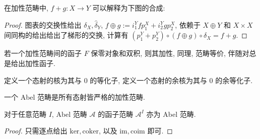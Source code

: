 \begin{lemma}
    在加性范畴中, \(f + g : X \to Y\) 可以解释为下图的合成:

    \begin{center}
    \end{center}

    \begin{proof}
        图表的交换性给出 \(\delta_X, \hat{\delta}_Y\), \(f \oplus g := i_1^Y f p_1^X + i_2^Y g p_2^X\),
        依赖于 \(X \oplus Y\) 和 \(X \times X\) 间同构的给出给出了梯形的交换, 计算有 \((p_1^Y + p_2^Y) \circ (f \oplus g) \circ \delta_X = f + g\).
    \end{proof}
\end{lemma}

\begin{corollary}
    若一个加性范畴间的函子 \(F\) 保零对象和双积, 则其加性, 同理, 范畴等价, 伴随对总是给出加性函子.
\end{corollary}

\begin{definition}
    定义一个态射的核为其与 \(0\) 的等化子, 定义一个态射的余核为其与 \(0\) 的余等化子.
\end{definition}

\begin{definition}[Abel 范畴]
    一个 Abel 范畴是所有态射皆严格的加性范畴.
\end{definition}

\begin{lemma}
    对于任意范畴 \(I\), Abel 范畴 \(\mathcal{A}\) 的函子范畴 \(\mathcal{A}^I\) 亦为 Abel 范畴.

    \begin{proof}
        只需逐点给出 \(\mathrm{ker}, \mathrm{coker}\), 以及 \(\mathrm{im}, \mathrm{coim}\) 即可.
    \end{proof}
\end{lemma}

